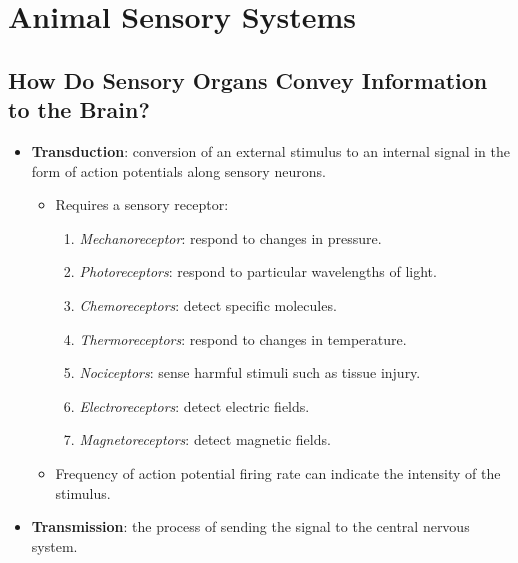 \documentclass[12pt,a4paper]{article}
\begin{document}
\tableofcontents
\cleardoublepage
\fancyhead{}

\clearpage
\setcounter{section}{43}
\section{Animal Sensory Systems}
\subsection{How Do Sensory Organs Convey Information to the Brain?}
\begin{itemize}
    \item \textbf{Transduction}: conversion of an external stimulus to an internal signal in the form of action potentials along sensory neurons.
    \begin{itemize}
        \item Requires a sensory receptor:
        \begin{enumerate}
            \item \textit{Mechanoreceptor}: respond to changes in pressure.
            \item \textit{Photoreceptors}: respond to particular wavelengths of light.
            \item \textit{Chemoreceptors}: detect specific molecules.
            \item \textit{Thermoreceptors}: respond to changes in temperature.
            \item \textit{Nociceptors}: sense harmful stimuli such as tissue injury.
            \item \textit{Electroreceptors}: detect electric fields.
            \item \textit{Magnetoreceptors}: detect magnetic fields.
        \end{enumerate}
        \item Frequency of action potential firing rate can indicate the intensity of the stimulus.
    \end{itemize}
    \item \textbf{Transmission}: the process of sending the signal to the central nervous system.
\end{itemize}
\end{document}
